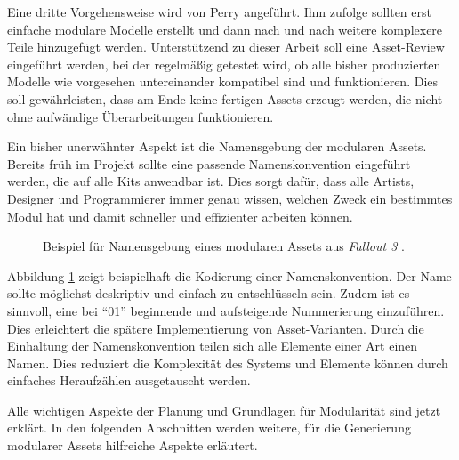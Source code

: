 \par
Eine dritte Vorgehensweise wird von Perry angeführt. Ihm zufolge sollten erst einfache modulare Modelle erstellt und dann nach und nach weitere komplexere Teile hinzugefügt werden. Unterstützend zu dieser Arbeit soll eine Asset-Review eingeführt werden, bei der regelmäßig getestet wird, ob alle bisher produzierten Modelle wie vorgesehen untereinander kompatibel sind und funktionieren. Dies soll gewährleisten, dass am Ende keine fertigen Assets erzeugt werden, die nicht ohne aufwändige Überarbeitungen funktionieren. \parencite{Perry}
\par
Ein bisher unerwähnter Aspekt ist die Namensgebung der modularen Assets. Bereits früh im Projekt sollte eine passende Namenskonvention eingeführt werden, die auf alle Kits anwendbar ist. Dies sorgt dafür, dass alle Artists, Designer und Programmierer immer genau wissen, welchen Zweck ein bestimmtes Modul hat und damit schneller und effizienter arbeiten können. \parencite{Burgess}

\begin{figure}[!h]
\centering
  \caption{Beispiel für Namensgebung eines modularen Assets aus \textit{Fallout 3} \parencite{Burgess}.}
	\label{namingConvention}
\end{figure}
Abbildung \ref{namingConvention} zeigt beispielhaft die Kodierung einer Namenskonvention. Der Name sollte möglichst deskriptiv und einfach zu entschlüsseln sein. Zudem ist es sinnvoll, eine bei \enquote{01} beginnende und aufsteigende Nummerierung einzuführen. Dies erleichtert die spätere Implementierung von Asset-Varianten. Durch die Einhaltung der Namenskonvention teilen sich alle Elemente einer Art einen Namen. Dies reduziert die Komplexität des Systems und Elemente können durch einfaches Heraufzählen ausgetauscht werden. \parencite{Burgess}
\par
Alle wichtigen Aspekte der Planung und Grundlagen für Modularität sind jetzt erklärt. In den folgenden Abschnitten werden weitere, für die Generierung modularer Assets hilfreiche Aspekte erläutert. 
